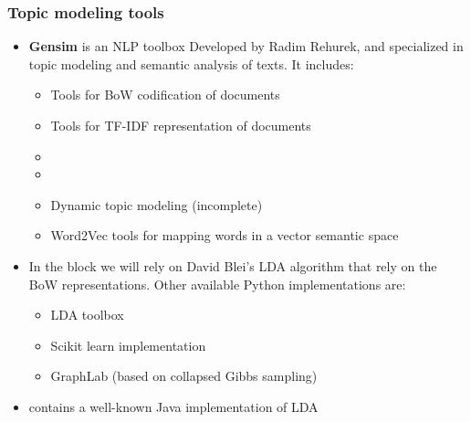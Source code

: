 \documentclass{beamer}
\begin{document}
\begin{frame}

    \frametitle{Topic modeling tools}

	\begin{itemize}
  
    	\item {\bf Gensim} is an NLP toolbox Developed by Radim Rehurek, and specialized in topic modeling and semantic analysis of texts. It includes:
    	\begin{itemize}
			\item Tools for BoW codification of documents
			\item Tools for TF-IDF representation of documents
			\item {\color{blue}{\bf Latent Semantic Indexing (LSA/LSI)}}
			\item {\color{blue}{\bf Latent Dirichlet Allocation (LDA)}}
			\item Dynamic topic modeling (incomplete)
			\item Word2Vec tools for mapping words in a vector semantic space
		\end{itemize}
		\item In the block we will rely on David Blei's LDA algorithm that rely on the BoW representations. Other available Python implementations are:
		\begin{itemize}
			\item LDA toolbox
			\item Scikit learn implementation
			\item GraphLab (based on collapsed Gibbs sampling)
		\end{itemize} 
		\item {\color{blue}{\bf MALLET}} contains a well-known Java implementation of LDA
    
    \end{itemize}

\end{frame}
\end{document}
